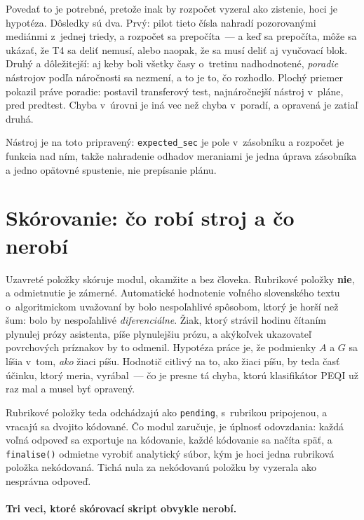 Povedať to je potrebné, pretože inak by rozpočet vyzeral ako zistenie, hoci je
hypotéza. Dôsledky sú dva. Prvý: pilot tieto čísla nahradí pozorovanými mediánmi
z~jednej triedy, a rozpočet sa prepočíta~--- a keď sa prepočíta, môže sa ukázať,
že T4 sa deliť nemusí, alebo naopak, že sa musí deliť aj vyučovací blok. Druhý a
dôležitejší: aj keby boli všetky časy o~tretinu nadhodnotené, \emph{poradie}
nástrojov podľa náročnosti sa nezmení, a to je to, čo rozhodlo. Plochý priemer
pokazil práve poradie: postavil transferový test, najnáročnejší nástroj v~pláne,
pred predtest. Chyba v~úrovni je iná vec než chyba v~poradí, a opravená je zatiaľ
druhá.

Nástroj je na toto pripravený: \texttt{expected\_sec} je pole v~zásobníku a
rozpočet je funkcia nad ním, takže nahradenie odhadov meraniami je jedna úprava
zásobníka a jedno opätovné spustenie, nie prepísanie plánu.

\section{Skórovanie: čo robí stroj a čo nerobí}
\label{sec:skorovanie}

Uzavreté položky skóruje modul, okamžite a bez človeka. Rubrikové položky
\textbf{nie}, a odmietnutie je zámerné. Automatické hodnotenie voľného
slovenského textu o~algoritmickom uvažovaní by bolo nespoľahlivé spôsobom, ktorý
je horší než šum: bolo by nespoľahlivé \emph{diferenciálne}. Žiak, ktorý strávil
hodinu čítaním plynulej prózy asistenta, píše plynulejšiu prózu, a akýkoľvek
ukazovateľ povrchových príznakov by to odmenil. Hypotéza práce je, že podmienky
$A$ a $G$ sa líšia v~tom, \emph{ako} žiaci píšu. Hodnotič citlivý na to, ako
žiaci píšu, by teda časť účinku, ktorý meria, vyrábal~--- čo je presne tá chyba,
ktorú klasifikátor PEQI už raz mal a musel byť opravený.

Rubrikové položky teda odchádzajú ako \texttt{pending}, s~rubrikou pripojenou,
a vracajú sa dvojito kódované. Čo modul zaručuje, je úplnosť odovzdania: každá
voľná odpoveď sa exportuje na kódovanie, každé kódovanie sa načíta späť, a
\texttt{finalise()} odmietne vyrobiť analytický súbor, kým je hoci jedna
rubriková položka nekódovaná. Tichá nula za nekódovanú položku by vyzerala ako
nesprávna odpoveď.

\paragraph{Tri veci, ktoré skórovací skript obvykle nerobí.}

